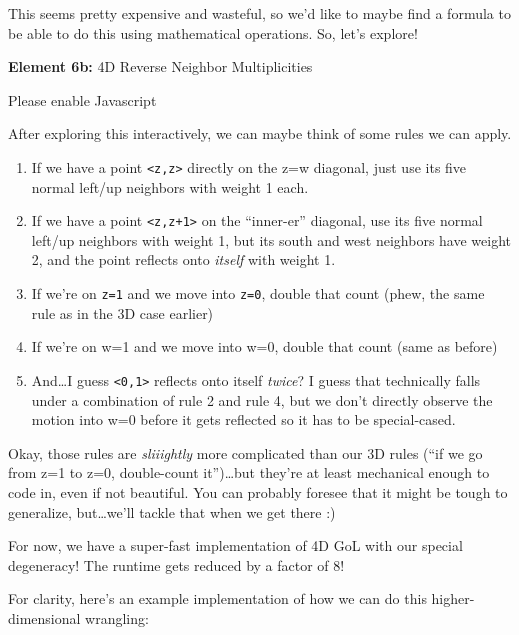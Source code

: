 \documentclass[]{article}
\begin{document}
This seems pretty expensive and wasteful, so we'd like to maybe find a formula
to be able to do this using mathematical operations. So, let's explore!

\leavevmode\hypertarget{golSyms4DReverse}{}%
\textbf{Element 6b:} 4D Reverse Neighbor Multiplicities

\leavevmode\hypertarget{golSyms4DReverseCont}{}%
Please enable Javascript

After exploring this interactively, we can maybe think of some rules we can
apply.

\begin{enumerate}
\def\labelenumi{\arabic{enumi}.}
\tightlist
\item
  If we have a point \texttt{\textless{}z,z\textgreater{}} directly on the z=w
  diagonal, just use its five normal left/up neighbors with weight 1 each.
\item
  If we have a point \texttt{\textless{}z,z+1\textgreater{}} on the ``inner-er''
  diagonal, use its five normal left/up neighbors with weight 1, but its south
  and west neighbors have weight 2, and the point reflects onto \emph{itself}
  with weight 1.
\item
  If we're on \texttt{z=1} and we move into \texttt{z=0}, double that count
  (phew, the same rule as in the 3D case earlier)
\item
  If we're on w=1 and we move into w=0, double that count (same as before)
\item
  And\ldots I guess \texttt{\textless{}0,1\textgreater{}} reflects onto itself
  \emph{twice}? I guess that technically falls under a combination of rule 2 and
  rule 4, but we don't directly observe the motion into w=0 before it gets
  reflected so it has to be special-cased.
\end{enumerate}

Okay, those rules are \emph{sliiightly} more complicated than our 3D rules (``if
we go from z=1 to z=0, double-count it'')\ldots but they're at least mechanical
enough to code in, even if not beautiful. You can probably foresee that it might
be tough to generalize, but\ldots we'll tackle that when we get there :)

For now, we have a super-fast implementation of 4D GoL with our special
degeneracy! The runtime gets reduced by a factor of 8!

For clarity, here's an example implementation of how we can do this
higher-dimensional wrangling:
\end{document}
